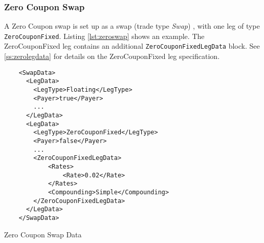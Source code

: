 \subsubsection{Zero Coupon Swap}

A Zero Coupon swap is set up as a swap (trade type \emph{Swap}) , with one leg of type {\tt ZeroCouponFixed}. Listing \ref{lst:zeroswap} shows an
example. The ZeroCouponFixed leg contains an additional {\tt ZeroCouponFixedLegData} block. See \ref{ss:zerolegdata} for details on the ZeroCouponFixed leg
specification.

\begin{listing}[H]
\begin{verbatim}
    <SwapData>
      <LegData>
        <LegType>Floating</LegType>
        <Payer>true</Payer>
        ...
      </LegData>
      <LegData>
        <LegType>ZeroCouponFixed</LegType>
        <Payer>false</Payer>
        ...
        <ZeroCouponFixedLegData>
            <Rates>
                <Rate>0.02</Rate>
            </Rates>
            <Compounding>Simple</Compounding>
        </ZeroCouponFixedLegData>
      </LegData>
    </SwapData>
\end{verbatim}
\caption{Zero Coupon Swap Data}
\label{lst:zeroswap}
\end{listing}
